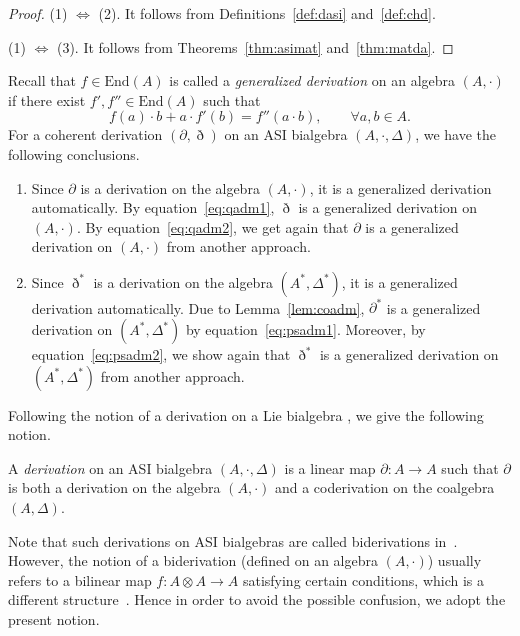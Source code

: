 \documentclass[pdftex]{sigma}
\numberwithin{equation}{section}
\newcommand{\End}{\mathrm{End}}
\begin{document}
\begin{proof}
(1) $\Longleftrightarrow$ (2). It follows from
Definitions~\ref{def:dasi} and~\ref{def:chd}.

(1) $\Longleftrightarrow$ (3). It follows from
Theorems~\ref{thm:asimat} and~\ref{thm:matda}.
\end{proof}

Recall \cite{KP,leger2000generalized} that $f \in \End(A)$ is called a \textit{generalized derivation} on an algebra $(A, \cdot)$ if there exist $f', f'' \in \End(A)$ such that
\begin{equation*}
	f(a) \cdot b + a \cdot f'(b) = f''(a \cdot b), \qquad \forall a, b \in
	A.
\end{equation*}
For a coherent derivation $(\partial, \eth)$ on an ASI bialgebra $(A, \cdot,
\Delta)$, we have the following conclusions.
\begin{enumerate}\itemsep=0pt
	\item
	Since $\partial$ is a derivation on the algebra $(A,\cdot)$,
	it is a generalized derivation automatically.
	By equation~\eqref{eq:qadm1}, $\eth$ is a generalized derivation on $(A,\cdot)$.
	By equation~\eqref{eq:qadm2}, we get again that $\partial$ is a generalized derivation on $(A,\cdot)$ from another approach.

	\item
	Since $\eth^*$ is a derivation on the algebra $(A^*,\Delta^*)$, it is a generalized derivation automatically.
	Due to Lemma~\ref{lem:coadm}, $\partial^*$ is a generalized derivation on $(A^*, \Delta^*)$ by equation~\eqref{eq:psadm1}.
	Moreover, by equation~\eqref{eq:psadm2}, we show again that $\eth^*$ is a generalized derivation on $(A^*, \Delta^*)$ from another approach.
\end{enumerate}

Following the notion of a derivation on a Lie bialgebra \cite{chari1995guide}, we give the following notion.

\begin{Definition}A \textit{derivation} on an ASI bialgebra $(A, \cdot, \Delta)$ is a linear map $\partial\colon A \to A$ such that
 $\partial$ is both a derivation on the algebra $(A, \cdot)$ and a coderivation on the coalgebra $(A, \Delta)$.
\end{Definition}
Note that such derivations on ASI bialgebras are called biderivations in~\cite{aguiar2004infinitesimal}.
However, the notion of a biderivation (defined on an algebra $(A,\cdot)$) usually refers to a bilinear map ${f\colon A\otimes A \rightarrow A}$ satisfying certain conditions, which is a different structure~\cite{liu2018biderivations}.
Hence in order to avoid the possible confusion, we adopt the present notion.
\end{document}
